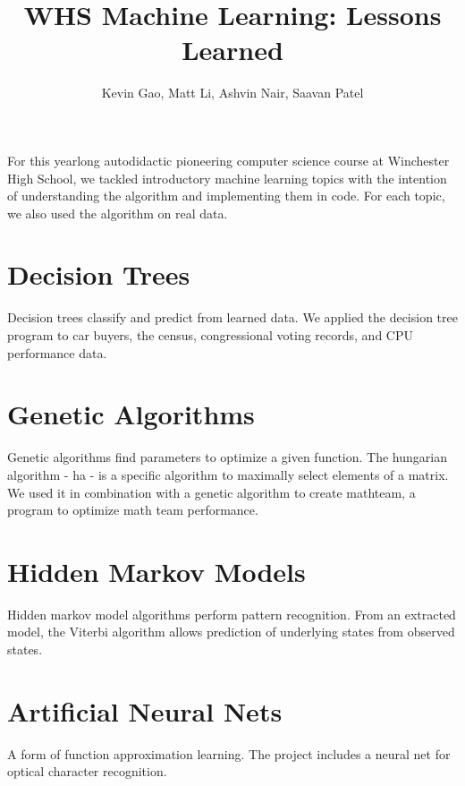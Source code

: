 \documentclass[12pt,a4paper]{article}
\author{Kevin Gao, Matt Li, Ashvin Nair, Saavan Patel}
\title{WHS Machine Learning: Lessons Learned}
\begin{document}
\maketitle

For this yearlong autodidactic pioneering computer science course at Winchester High School, we tackled introductory machine learning topics with the intention of understanding the algorithm and implementing them in code. For each topic, we also used the algorithm on real data.

\section{Decision Trees}

Decision trees classify and predict from learned data. We applied the decision tree program to car buyers, the census, congressional voting records, and CPU performance data.

\section{Genetic Algorithms}

Genetic algorithms find parameters to optimize a given function. The hungarian algorithm - ha - is a specific algorithm to maximally select elements of a matrix. We used it in combination with a genetic algorithm to create mathteam, a program to optimize math team performance.

\section{Hidden Markov Models} 
Hidden markov model algorithms perform pattern recognition. From an extracted model, the Viterbi algorithm allows prediction of underlying states from observed states.

\section{Artificial Neural Nets}
A form of function approximation learning. The project includes a neural net for optical character recognition.
\end{document}
